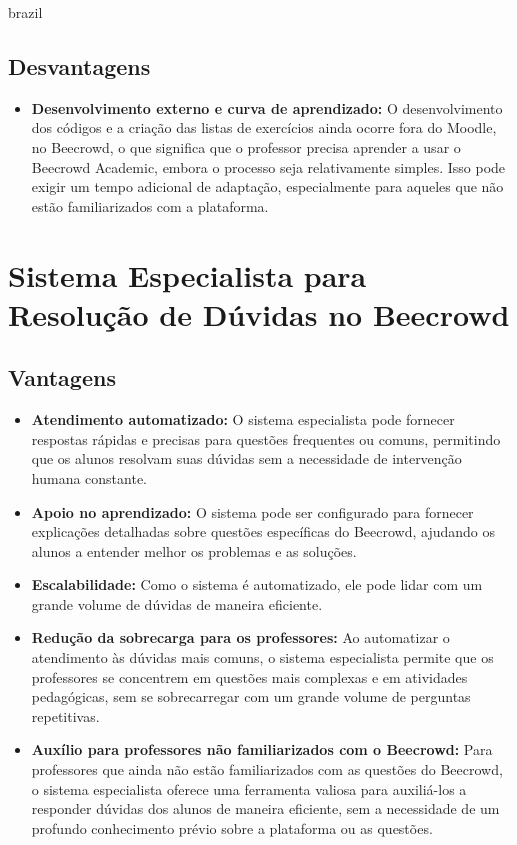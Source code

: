 \begin{otherlanguage*}{brazil}
\subsection{Desvantagens}
\begin{itemize}
    \item \textbf{Desenvolvimento externo e curva de aprendizado:} O desenvolvimento dos códigos e a criação das listas de exercícios ainda ocorre fora do Moodle, no Beecrowd, o que significa que o professor precisa aprender a usar o Beecrowd Academic, embora o processo seja relativamente simples. Isso pode exigir um tempo adicional de adaptação, especialmente para aqueles que não estão familiarizados com a plataforma.
\end{itemize}

\section{Sistema Especialista para Resolução de Dúvidas no Beecrowd}

\subsection{Vantagens}
\begin{itemize}
    \item \textbf{Atendimento automatizado:} O sistema especialista pode fornecer respostas rápidas e precisas para questões frequentes ou comuns, permitindo que os alunos resolvam suas dúvidas sem a necessidade de intervenção humana constante.
    \item \textbf{Apoio no aprendizado:} O sistema pode ser configurado para fornecer explicações detalhadas sobre questões específicas do Beecrowd, ajudando os alunos a entender melhor os problemas e as soluções.
    \item \textbf{Escalabilidade:} Como o sistema é automatizado, ele pode lidar com um grande volume de dúvidas de maneira eficiente.
    \item \textbf{Redução da sobrecarga para os professores:} Ao automatizar o atendimento às dúvidas mais comuns, o sistema especialista permite que os professores se concentrem em questões mais complexas e em atividades pedagógicas, sem se sobrecarregar com um grande volume de perguntas repetitivas.
    \item \textbf{Auxílio para professores não familiarizados com o Beecrowd:} Para professores que ainda não estão familiarizados com as questões do Beecrowd, o sistema especialista oferece uma ferramenta valiosa para auxiliá-los a responder dúvidas dos alunos de maneira eficiente, sem a necessidade de um profundo conhecimento prévio sobre a plataforma ou as questões.
\end{itemize}


\end{otherlanguage*}
